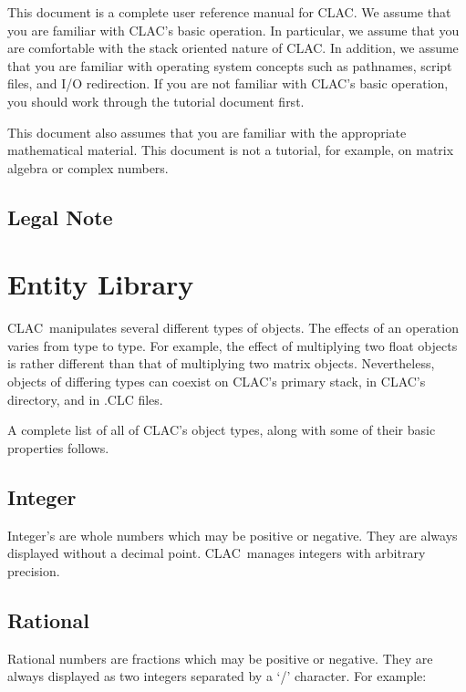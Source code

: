 \documentclass{report}
\newcommand{\CLAC}{CLAC}
\begin{document}
This document is a complete user reference manual for \CLAC. We assume
that you are familiar with \CLAC's basic operation. In particular, we
assume that you are comfortable with the stack oriented nature of \CLAC.
In addition, we assume that you are familiar with operating system
concepts such as pathnames, script files, and I/O redirection. If you
are not familiar with \CLAC's basic operation, you should work through
the tutorial document first.

This document also assumes that you are familiar with the appropriate
mathematical material. This document is not a tutorial, for example, on
matrix algebra or complex numbers.

\section{Legal Note}

%
%

\chapter{Entity Library}

\CLAC\ manipulates several different types of objects. The effects of an
operation varies from type to type. For example, the effect of
multiplying two float objects is rather different than that of
multiplying two matrix objects. Nevertheless, objects of differing types
can coexist on \CLAC's primary stack, in \CLAC's directory, and in .CLC
files.

A complete list of all of \CLAC's object types, along with some of their
basic properties follows.

\section{Integer}

Integer's are whole numbers which may be positive or negative. They are
always displayed without a decimal point. \CLAC\ manages integers with
arbitrary precision.

\section{Rational}

Rational numbers are fractions which may be positive or negative. They are
always displayed as two integers separated by a `/' character. For example:
\end{document}
